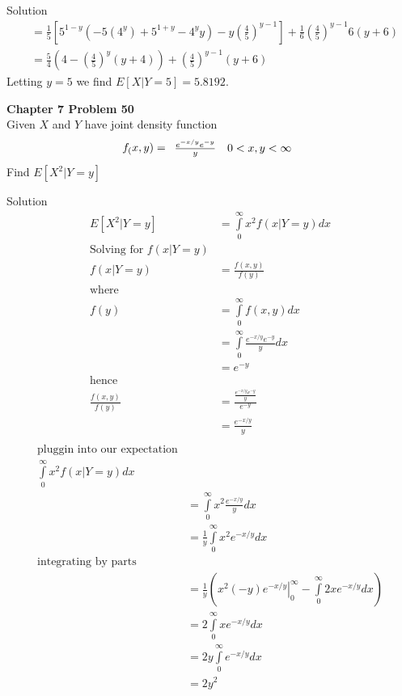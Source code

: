 \documentclass{article}
\begin{document}
\begin{spacing}{1.1}
\begin{homeworkProblem}
\begin{enumerate}[(a)]
\begin{homeworkSection}{Solution}
\begin{align*}
          &=\frac{1}{5}[5^{1-y} (-5(4^y)+5^{1+y}-4^yy)-y(\frac{4}{5})^{y-1}]+\frac{1}{6}(\frac{4}{5})^{y-1}6(y+6)\\
          &=\frac{5}{4}(4-(\frac{4}{5})^y(y+4))+(\frac{4}{5})^{y-1}(y+6)
        \end{align*}
        Letting $y = 5$ we find $E[X|Y = 5] = 5.8192$.
      \end{homeworkSection}
  \end{enumerate}
\end{homeworkProblem}

\newpage
\begin{homeworkProblem}
  {\bf Chapter 7 Problem 50}\\
  Given $X$ and $Y$ have joint density function
  \[
    f_( x, y) = \begin{array}{l l}
      \frac{ e^{-x/y} e^{-y}}{ y} & 0 < x,y < \infty\\
    \end{array}
  \]
  Find $E[ X^2|Y = y]$
  \begin{homeworkSection}{Solution}
    \begin{align*}
      E[ X^2|Y = y]
        &= \int\limits_0^\infty x^2 f(x | Y = y) dx\\
      \text{Solving for $f(x | Y = y)$}\\
      f(x | Y = y) 
        &= \frac{ f( x, y)}{ f( y)}\\
        \text{where}\\
        f( y) &= \int\limits_0^\infty f( x, y) dx\\
        &= \int\limits_0^\infty \frac{ e^{-x/y} e^{-y}}{ y} dx\\
        &= e^{-y}\\
        \text{hence}\\
      \frac{ f( x, y)}{ f( y)}
        &= \frac{ \frac{ e^{-x/y} e^{-y}}{ y}}{ e^{-y}}\\
        &= \frac{ e^{-x/y}}{ y}\\
    \end{align*}
    \begin{align*}
      \text{pluggin into our expectation}\\
      \int\limits_0^\infty x^2 f(x | Y = y) dx\\
      &= \int\limits_0^\infty x^2 \frac{ e^{-x/y}}{ y} dx\\
      &= \frac{ 1}{ y} \int\limits_0^\infty x^2 e^{-x/y} dx\\
      \text{integrating by parts}\\
      &= \frac{ 1}{ y}\left( \left.x^2(-y)e^{-x/y}\right|_0^\infty - \int\limits_0^\infty 2x e^{-x/y} dx\right)\\
      &= 2 \int\limits_0^\infty x e^{-x/y} dx\\
      &= 2y \int\limits_0^\infty e^{-x/y} dx\\
      &= 2y^2
    \end{align*}
  \end{homeworkSection}
\end{homeworkProblem}


\end{spacing}
\end{document}
